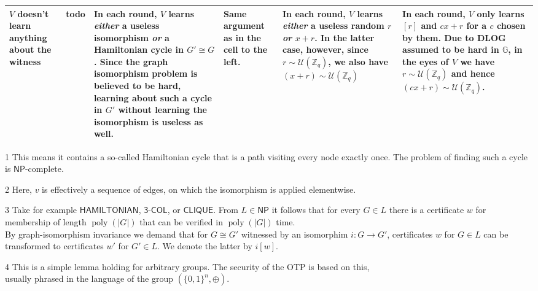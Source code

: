 \documentclass[border=1cm,varwidth=37cm]{standalone}
\DeclareMathOperator\poly{poly}
\newcommand{\complexityProblem}[1]{\textsf{#1}}
\newcommand\NP{\complexityProblem{NP}}
\newcommand\graph{G}
\newcommand\graphP{G'}
\newcommand\graphCert{w}
\newcommand\graphCertP{w'}
\newcommand{\centeredCell}[1]{\centering#1\arraybackslash}
\begin{document}
\begin{threeparttable}
\begin{tabular}{m{4cm}|m{6cm}|m{6cm}|m{6cm}|m{6cm}|m{6cm}}
	\centeredCell{$V$ doesn't learn anything about the witness}
	& todo
	& In each round, $V$ learns \emph{either} a useless isomorphism \emph{or} a Hamiltonian cycle in $\graphP \cong \graph$. Since the graph isomorphism problem is believed to be hard, learning about such a cycle in $\graphP$ without learning the isomorphism is useless as well.
	& Same argument as in the cell to the left.
	& In each round, $V$ learns \emph{either} a useless random $r$ \emph{or} $x + r$. In the latter case, however, since $r \sim \mathcal{U}(\mathbb{Z}_q)$, we also have $(x + r) \sim \mathcal{U}(\mathbb{Z}_q)$\tnote{4}
	& In each round, $V$ only learns $[r]$ and $cx + r$ for a $c$ chosen by them. Due to DLOG assumed to be hard in $\mathbb{G}$, in the eyes of $V$ we have $r \sim \mathcal{U}(\mathbb{Z}_q)$ and hence $(cx + r) \sim \mathcal{U}(\mathbb{Z}_q)$\tnote{4}.\\\hline\hline
\end{tabular}
\begin{tablenotes}
	\item[1] This means it contains a so-called Hamiltonian cycle that is a path visiting every node exactly once. The problem of finding such a cycle is $\NP$-complete.
	\item[2] Here, $v$ is effectively a sequence of edges, on which the isomorphism is applied elementwise.
	\item[3] Take for example $\complexityProblem{HAMILTONIAN}$, $\complexityProblem{3-COL}$, or $\complexityProblem{CLIQUE}$. From $L \in \NP$ it follows that for every $\graph \in L$ there is a certificate $w$ for membership of length $\poly(|\graph|)$ that can be verified in $\poly(|\graph|)$ time.\\By graph-isomorphism invariance we demand that for $\graph \cong \graphP$ witnessed by an isomorphim $i \colon \graph \to \graphP$, certificates $\graphCert$ for $\graph \in L$ can be transformed to certificates $\graphCertP$ for $\graphP \in L$. We denote the latter by $i[\graphCert]$.
	\item[4] This is a simple lemma holding for arbitrary groups. The security of the OTP is based on this,\\usually phrased in the language of the group $(\{0,1\}^n, \oplus)$.
\end{tablenotes}
\end{threeparttable}
\end{document}
